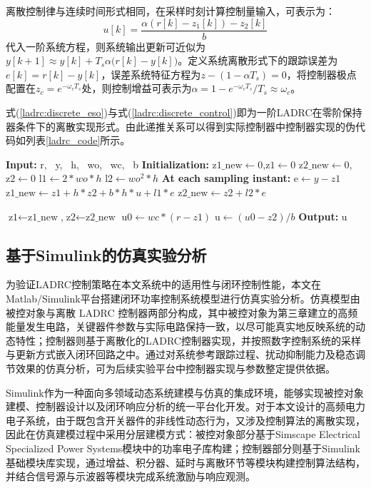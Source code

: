 离散控制律与连续时间形式相同，在采样时刻计算控制量输入，可表示为：
\begin{equation}
	u[k] = \frac{\alpha(r[k]-z_1[k])-z_2[k]} {b}       \label{ladrc:discrete_control}
\end{equation}
代入一阶系统方程，则系统输出更新可近似为$y [ k+1 ] \approx y [ k ]+T_{s} \alpha \bigl( r [ k ]-y [ k ] \bigr)$。定义系统离散形式下的跟踪误差为$e[k]=r[k]-y[k]$，误差系统特征方程为$z-( 1-\alpha T_{s} )=0$，将控制器极点配置在$z_c=e^{-\omega_c T_s}$处，则控制增益可表示为$\alpha = 1-e^{-\omega_{c} T_{s}}/T_{s} \approx \omega_c$。

式(\ref{ladrc:discrete_eso})与式(\ref{ladrc:discrete_control})即为一阶LADRC在零阶保持器条件下的离散实现形式。由此递推关系可以得到实际控制器中控制器实现的伪代码如列表\ref{ladrc_code}所示。
\begin{algorithm}
	\caption{一阶LADRC控制器实现伪代码}
	\label{ladrc_code}
	\begin{algorithmic}[1]
		\setlength{\baselineskip}{16pt} %
		\State \textbf{Input:} r, \ y, \ h, \ wo, \ wc, \ b
		\State \textbf{Initialization:}
		\State $\text{z1\_new} \gets 0$,\quad $\text{z1} \gets 0$
		\State $\text{z2\_new} \gets 0$,\quad $\text{z2} \gets 0$
		\State $\text{l1} \gets 2*wo*h$
		\State $\text{l2} \gets wo^2*h$
		\State \textbf{At each sampling instant:}
		\State $\text{e} \gets y-z1$
		\State$\text{z1\_new} \gets z1 + h*z2 + b*h*u + l1*e$
		\State$\text{z2\_new} \gets z2 + l2*e$

		\State$\text{z1} \gets \text{z1\_new}$,\quad $\text{z2} \gets \text{z2\_new}$
		\State$\text{u0} \gets wc*(r-z1)$
		\State$\text{u} \gets (u0-z2)/b$
		\State \textbf{Output:} u
	\end{algorithmic}
\end{algorithm}

\subsection{基于Simulink的仿真实验分析}
为验证LADRC控制策略在本文系统中的适用性与闭环控制性能，本文在Matlab/Simulink平台搭建闭环功率控制系统模型进行仿真实验分析。仿真模型由被控对象与离散 LADRC 控制器两部分构成，其中被控对象为第三章建立的高频能量发生电路，关键器件参数与实际电路保持一致，以尽可能真实地反映系统的动态特性；控制器则基于离散化的LADRC控制器实现，并按照数字控制系统的采样与更新方式嵌入闭环回路之中。通过对系统参考跟踪过程、扰动抑制能力及稳态调节效果的仿真分析，可为后续实验平台中控制器实现与参数整定提供依据。

Simulink作为一种面向多领域动态系统建模与仿真的集成环境，能够实现被控对象建模、控制器设计以及闭环响应分析的统一平台化开发。对于本文设计的高频电力电子系统，由于既包含开关器件的非线性动态行为，又涉及控制算法的离散实现，因此在仿真建模过程中采用分层建模方式：被控对象部分基于Simscape Electrical Specialized Power Systems模块中的功率电子库构建；控制器部分则基于Simulink基础模块库实现，通过增益、积分器、延时与离散环节等模块构建控制算法结构，并结合信号源与示波器等模块完成系统激励与响应观测。

